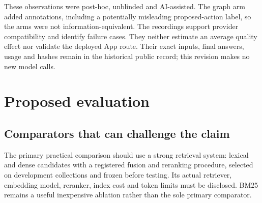 \documentclass[
  11pt,
]{article}
\let\originalsection\section
\renewcommand{\section}{\Needspace{5\baselineskip}\originalsection}
\begin{document}
These observations were post-hoc, unblinded and AI-assisted. The graph
arm added annotations, including a potentially misleading
proposed-action label, so the arms were not information-equivalent. The
recordings support provider compatibility and identify failure cases.
They neither estimate an average quality effect nor validate the
deployed App route. Their exact inputs, final answers, usage and hashes
remain in the historical public record; this revision makes no new model
calls.

\section{Proposed evaluation}\label{proposed-evaluation}

\subsection{Comparators that can challenge the
claim}\label{comparators-that-can-challenge-the-claim}

The primary practical comparison should use a strong retrieval system:
lexical and dense candidates with a registered fusion and reranking
procedure, selected on development collections and frozen before
testing. Its actual retriever, embedding model, reranker, index cost and
token limits must be disclosed. BM25 remains a useful inexpensive
ablation rather than the sole primary comparator.

\end{document}

